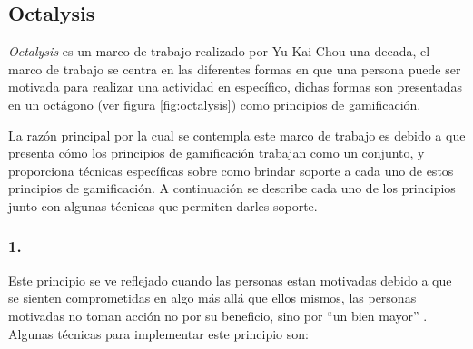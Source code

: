 \subsection{Octalysis}
\label{sec:octalysis}

 {\it Octalysis} es un marco de trabajo realizado por Yu-Kai Chou una decada, el marco de
 trabajo se centra en las diferentes formas en que una persona puede ser motivada para
 realizar una actividad en específico, dichas formas son presentadas en un octágono
 (ver figura \ref{fig:octalysis}) como principios de gamificación.\\
 
    

 \noindent La razón principal por la cual se contempla este marco de trabajo es debido a que presenta
 cómo los principios de gamificación trabajan como un conjunto, y proporciona técnicas específicas
 sobre como brindar soporte a cada uno de estos principios de gamificación. A continuación se
 describe cada uno de los principios junto con algunas técnicas que permiten darles soporte.
    
\subsubsection{1. \principioI} \label{subsec:principioI}
  
 Este principio se ve reflejado cuando las personas estan motivadas debido a que se
 sienten comprometidas en algo más allá que ellos mismos, las personas motivadas no toman acción
 no por su beneficio, sino por ``un bien mayor'' \cite[p. 66, 69]{Octalysis}. Algunas técnicas
 para implementar este principio son:
    
